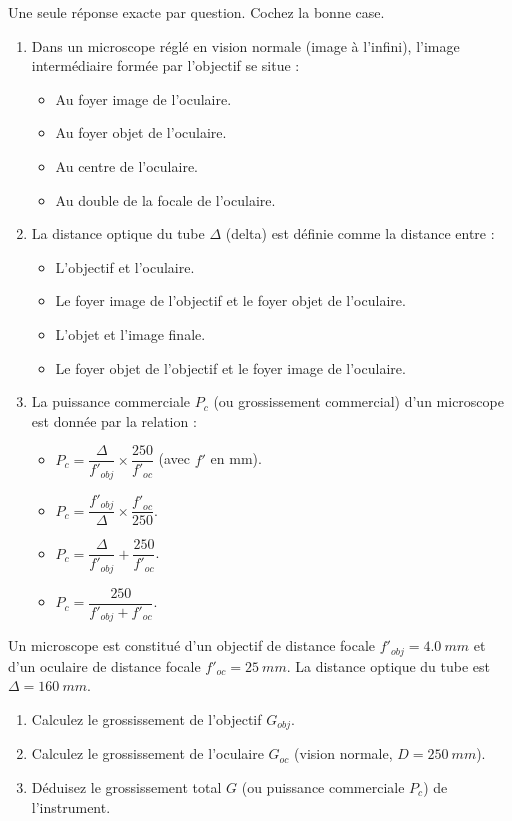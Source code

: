 \documentclass[11pt]{article}
\begin{document}
\begin{exercice}
\label{exo:qcm}
Une seule réponse exacte par question. Cochez la bonne case.
\begin{enumerate}
\item Dans un microscope réglé en vision normale (image à l'infini), l'image intermédiaire formée par l'objectif se situe :
\begin{itemize}
    \item[$\square$] Au foyer image de l'oculaire.
    \item[$\square$] Au foyer objet de l'oculaire.
    \item[$\square$] Au centre de l'oculaire.
    \item[$\square$] Au double de la focale de l'oculaire.
\end{itemize}
\item La distance optique du tube $\Delta$ (delta) est définie comme la distance entre :
\begin{itemize}
    \item[$\square$] L'objectif et l'oculaire.
    \item[$\square$] Le foyer image de l'objectif et le foyer objet de l'oculaire.
    \item[$\square$] L'objet et l'image finale.
    \item[$\square$] Le foyer objet de l'objectif et le foyer image de l'oculaire.
\end{itemize}
\item La puissance commerciale $P_c$ (ou grossissement commercial) d'un microscope est donnée par la relation :
\begin{itemize}
    \item[$\square$] $P_c = \dfrac{\Delta}{f'_{obj}} \times \dfrac{250}{f'_{oc}}$ (avec $f'$ en mm).
    \item[$\square$] $P_c = \dfrac{f'_{obj}}{\Delta} \times \dfrac{f'_{oc}}{250}$.
    \item[$\square$] $P_c = \dfrac{\Delta}{f'_{obj}} + \dfrac{250}{f'_{oc}}$.
    \item[$\square$] $P_c = \dfrac{250}{f'_{obj} + f'_{oc}}$.
\end{itemize}
\end{enumerate}
\end{exercice}

\begin{exercice}
\label{exo:calc}
Un microscope est constitué d'un objectif de distance focale $f'_{obj} = \SI{4,0}{mm}$ et d'un oculaire de distance focale $f'_{oc} = \SI{25}{mm}$. La distance optique du tube est $\Delta = \SI{160}{mm}$.
\begin{enumerate}
\item Calculez le grossissement de l'objectif $G_{obj}$.
\item Calculez le grossissement de l'oculaire $G_{oc}$ (vision normale, $D = \SI{250}{mm}$).
\item Déduisez le grossissement total $G$ (ou puissance commerciale $P_c$) de l'instrument.
\end{enumerate}
\end{exercice}
\end{document}
